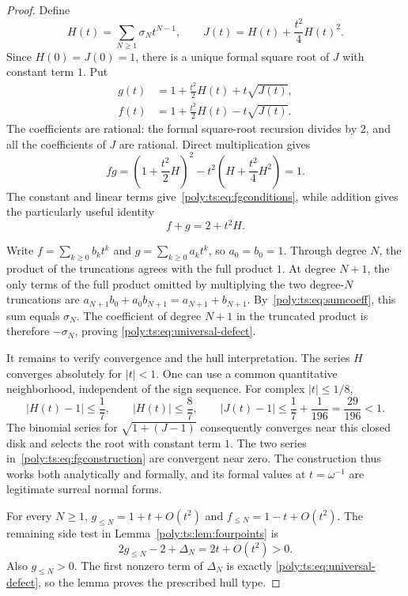 \documentclass[11pt,a4paper]{article}
\numberwithin{equation}{section}
\theoremstyle{plain}
\begin{document}
\begin{proof}
Define
\begin{equation}\label{poly:ts:eq:H-J}
 H(t)=\sum_{N\ge1}\sigma_Nt^{N-1},
 \qquad J(t)=H(t)+\frac{t^2}{4}H(t)^2.
\end{equation}
Since $H(0)=J(0)=1$, there is a unique formal square root of $J$ with
constant term $1$. Put
\begin{equation}\label{poly:ts:eq:fgconstruction}
 \begin{split}
 g(t)&=1+\frac{t^2}{2}H(t)+t\sqrt{J(t)},\\
 f(t)&=1+\frac{t^2}{2}H(t)-t\sqrt{J(t)}.
 \end{split}
\end{equation}
The coefficients are rational: the formal square-root recursion divides
by $2$, and all the coefficients of $J$ are rational. Direct multiplication
gives
\[
 fg=\left(1+\frac{t^2}{2}H\right)^2-t^2\left(H+\frac{t^2}{4}H^2\right)=1.
\]
The constant and linear terms give~\eqref{poly:ts:eq:fgconditions}, while addition
gives the particularly useful identity
\begin{equation}\label{poly:ts:eq:sumcoeff}
 f+g=2+t^2H.
\end{equation}

Write $f=\sum_{k\ge0}b_k t^k$ and $g=\sum_{k\ge0}a_k t^k$, so
$a_0=b_0=1$. Through degree $N$, the product of the truncations agrees
with the full product $1$. At degree $N+1$, the only terms of the full
product omitted by multiplying the two degree-$N$ truncations are
$a_{N+1}b_0+a_0b_{N+1}=a_{N+1}+b_{N+1}$. By~\eqref{poly:ts:eq:sumcoeff},
this sum equals $\sigma_N$. The coefficient of degree $N+1$ in the
truncated product is therefore $-\sigma_N$, proving
\eqref{poly:ts:eq:universal-defect}.

It remains to verify convergence and the hull interpretation. The series
$H$ converges absolutely for $|t|<1$. One can use a common quantitative
neighborhood, independent of the sign sequence. For complex $|t|\le1/8$,
\[
 |H(t)-1|\le\frac17,\qquad |H(t)|\le\frac87,
 \qquad |J(t)-1|\le\frac17+\frac1{196}=\frac{29}{196}<1.
\]
The binomial series for $\sqrt{1+(J-1)}$ consequently converges near this
closed disk and selects the root with constant term $1$. The two series
in~\eqref{poly:ts:eq:fgconstruction} are convergent near zero. The construction
thus works both analytically and formally, and its formal values at
$t=\omega^{-1}$ are legitimate surreal normal forms.

For every $N\ge1$, $g_{\le N}=1+t+O(t^2)$ and
$f_{\le N}=1-t+O(t^2)$. The remaining side test in
Lemma~\ref{poly:ts:lem:fourpoints} is
\[
 2g_{\le N}-2+\Delta_N=2t+O(t^2)>0.
\]
Also $g_{\le N}>0$. The first nonzero term of $\Delta_N$ is exactly
\eqref{poly:ts:eq:universal-defect}, so the lemma proves the prescribed hull type.
\end{proof}
\end{document}
